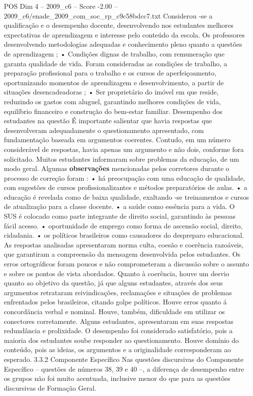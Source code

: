 \begin{textsample}{POS Dim 4 – 2009\_c6 – Score -2.00 – 2009\_c6/enade\_2009\_com\_soc\_rp\_c9c58bdcc7.txt}
Considerou -se a qualificação e o desempenho docente, desenvolvendo nos estudantes melhores expectativas de aprendizagem e interesse pelo conteúdo da escola.
Os professores desenvolvendo metodologias adequadas e conhecimento pleno quanto a questões de aprendizagem ; • Condições dignas de trabalho, com remuneração que garanta qualidade de vida.
Foram consideradas as condições de trabalho, a preparação profissional para o trabalho e os cursos de aperfeiçoamento, oportunizando momentos de aprendizagem e desenvolvimento, a partir de situações desencadeadoras ; • Ser proprietário do imóvel em que reside, reduzindo os gastos com aluguel, garantindo melhores condições de vida, equilíbrio financeiro e construção do bem-estar familiar.
Desempenho dos estudantes na questão É importante salientar que havia respostas que desenvolveram adequadamente o questionamento apresentado, com fundamentação baseada em argumentos coerentes.
Contudo, em um número considerável de respostas, havia apenas um argumento e não dois, conforme fora solicitado.
Muitos estudantes informaram sobre problemas da educação, de um modo geral.
Algumas \textbf{observações} mencionadas pelos corretores durante o processo de correção foram : • há preocupação com uma educação de qualidade, com sugestões de cursos profissionalizantes e métodos preparatórios de aulas. • a educação é revelada como de baixa qualidade, exaltando -se treinamentos e cursos de atualização para a classe docente. • a saúde como essência para a vida.
O SUS é colocado como parte integrante de direito social, garantindo às pessoas fácil acesso. • oportunidade de emprego como forma de ascensão social, direito, cidadania. • os políticos brasileiros como causadores do despreparo educacional.
As respostas analisadas apresentaram norma culta, coesão e coerência razoáveis, que garantiram a compreensão da mensagem desenvolvida pelos estudantes.
Os erros ortográficos foram poucos e não comprometeram a discussão sobre o assunto e sobre os pontos de vista abordados.
Quanto à coerência, houve um desvio quanto ao objetivo da questão, já que alguns estudantes, através dos seus argumentos retrataram reivindicações, reclamações e situações de problemas enfrentados pelos brasileiros, citando golpe políticos.
Houve erros quanto á concordância verbal e nominal.
Houve, também, dificuldade em utilizar os conectores corretamente.
Alguns estudantes, apresentaram em suas respostas redundância e prolixidade.
O desempenho foi considerado satisfatório, pois a maioria dos estudantes soube responder ao questionamento.
Houve domínio do conteúdo, pois as ideias, os argumentos e a originalidade corresponderam ao esperado. 3.3.2 Componente Específico Nas questões discursivas do Componente Específico – questões de números 38, 39 e 40 –, a diferença de desempenho entre os grupos não foi muito acentuada, inclusive menor do que para as questões discursivas de Formação Geral.

\end{textsample}

